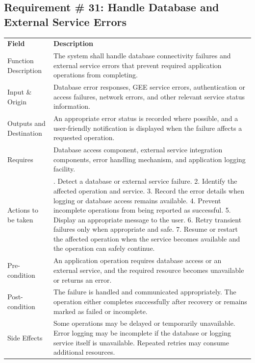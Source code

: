 \documentclass[12pt,a4paper]{report}
\begin{document}
\subsection{Requirement \# 31: Handle Database and External Service
Errors}\label{requirement-36-handle-database-and-external-service-errors}

\begin{longtable}[]{@{}
  >{\raggedright\arraybackslash}p{}
  >{\raggedright\arraybackslash}p{}@{}}
\toprule\noalign{}
\endhead
\bottomrule\noalign{}
\endlastfoot
\textbf{Field} & \textbf{Description} \\
Function Description & The system shall handle database connectivity
failures and external service errors that prevent required application
operations from completing. \\
Input \& Origin & Database error responses, GEE service errors,
authentication or access failures, network errors, and other relevant
service status information. \\
Outputs and Destination & An appropriate error status is recorded where
possible, and a user-friendly notification is displayed when the failure
affects a requested operation. \\
Requires & Database access component, external service integration
components, error handling mechanism, and application logging
facility. \\
Actions to be taken & 1. Detect a database or external service failure.
2. Identify the affected operation and service. 3. Record the error
details when logging or database access remains available. 4. Prevent
incomplete operations from being reported as successful. 5. Display an
appropriate message to the user. 6. Retry transient failures only when
appropriate and safe. 7. Resume or restart the affected operation when
the service becomes available and the operation can safely continue. \\
Pre-condition & An application operation requires database access or an
external service, and the required resource becomes unavailable or
returns an error. \\
Post-condition & The failure is handled and communicated appropriately.
The operation either completes successfully after recovery or remains
marked as failed or incomplete. \\
Side Effects & Some operations may be delayed or temporarily
unavailable. Error logging may be incomplete if the database or logging
service itself is unavailable. Repeated retries may consume additional
resources. \\
\end{longtable}
\end{document}
